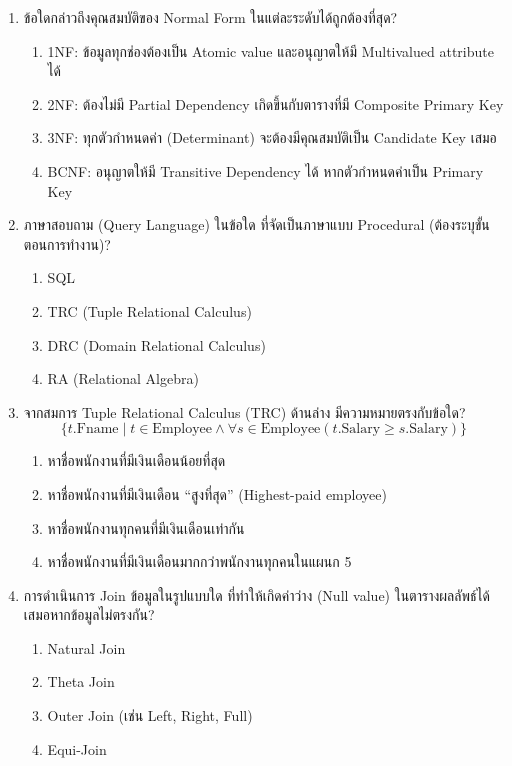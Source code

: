 \documentclass[a4paper,12pt]{article}
\begin{document}
\begin{enumerate}[label=\textbf{\arabic*.}]
    \item ข้อใดกล่าวถึงคุณสมบัติของ Normal Form ในแต่ละระดับได้ถูกต้องที่สุด?
    \begin{enumerate}[label=\alph*.]
        \item 1NF: ข้อมูลทุกช่องต้องเป็น Atomic value และอนุญาตให้มี Multivalued attribute ได้
        \item 2NF: ต้องไม่มี Partial Dependency เกิดขึ้นกับตารางที่มี Composite Primary Key
        \item 3NF: ทุกตัวกำหนดค่า (Determinant) จะต้องมีคุณสมบัติเป็น Candidate Key เสมอ
        \item BCNF: อนุญาตให้มี Transitive Dependency ได้ หากตัวกำหนดค่าเป็น Primary Key
    \end{enumerate}

    \item ภาษาสอบถาม (Query Language) ในข้อใด ที่จัดเป็นภาษาแบบ Procedural (ต้องระบุขั้นตอนการทำงาน)?
    \begin{enumerate}[label=\alph*.]
        \item SQL
        \item TRC (Tuple Relational Calculus)
        \item DRC (Domain Relational Calculus)
        \item RA (Relational Algebra)
    \end{enumerate}

    \item จากสมการ Tuple Relational Calculus (TRC) ด้านล่าง มีความหมายตรงกับข้อใด?\\
    \[ \{ t.\text{Fname} \mid t \in \text{Employee} \land \forall s \in \text{Employee} (t.\text{Salary} \ge s.\text{Salary}) \} \]
    \begin{enumerate}[label=\alph*.]
        \item หาชื่อพนักงานที่มีเงินเดือนน้อยที่สุด
        \item หาชื่อพนักงานที่มีเงินเดือน ``สูงที่สุด'' (Highest-paid employee)
        \item หาชื่อพนักงานทุกคนที่มีเงินเดือนเท่ากัน
        \item หาชื่อพนักงานที่มีเงินเดือนมากกว่าพนักงานทุกคนในแผนก 5
    \end{enumerate}

    \item การดำเนินการ Join ข้อมูลในรูปแบบใด ที่ทำให้เกิดค่าว่าง (Null value) ในตารางผลลัพธ์ได้เสมอหากข้อมูลไม่ตรงกัน?
    \begin{enumerate}[label=\alph*.]
        \item Natural Join
        \item Theta Join
        \item Outer Join (เช่น Left, Right, Full)
        \item Equi-Join
    \end{enumerate}


\end{enumerate}
\end{document}

